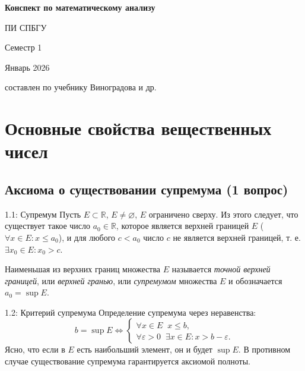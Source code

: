 \documentclass[a4paper,12pt]{article}
\begin{document}
	
	\begin{titlepage}
		\centering
		{\LARGE\bfseries Конспект по математическому анализу\par}
		\vspace{0.5cm}
		{\Large ПИ СПБГУ\par}
		\vspace{0.3cm}
		{\Large Семестр 1\par}
		
		\vspace{2cm}
		
		{\large Январь 2026\par}
		
		\vfill
		
		{\footnotesize составлен по учебнику Виноградова и др.\par}
	\end{titlepage}
	
	\newpage
	\tableofcontents
	
	
	
	
	
	
	
	\newpage
	\section{Основные свойства вещественных чисел}
	
	\subsection{Аксиома о существовании супремума (1 вопрос)}
	
	\begin{definitionbox}{1.1: Супремум}
		Пусть $E \subset \mathbb{R}$, $E \neq \varnothing$, $E$ ограничено сверху. Из этого следует, что существует такое число $a_0 \in \mathbb{R}$, которое является верхней границей $E$ ($\forall x \in E \colon x \le a_0$), и для любого $c < a_0$ число $c$ не является верхней границей, т. е. $\exists x_0 \in E \colon x_0 > c$.
		
		Наименьшая из верхних границ множества $E$ называется \textit{точной верхней границей}, или \textit{верхней гранью}, или \textit{супремумом} множества $E$ и обозначается $a_0 = \sup E$.
	\end{definitionbox}
	
	\begin{remarkbox}{1.2: Критерий супремума}
		Определение супремума через неравенства:
		\[
		b = \sup E \iff 
		\begin{cases}
			\forall x \in E \;\; x \leqslant b, \\
			\forall \varepsilon > 0 \;\; \exists x \in E \colon x > b - \varepsilon.
		\end{cases}
		\]
		Ясно, что если в $E$ есть наибольший элемент, он и будет $\sup E$. В противном случае существование супремума гарантируется аксиомой полноты.
	\end{remarkbox}
	
\end{document}
